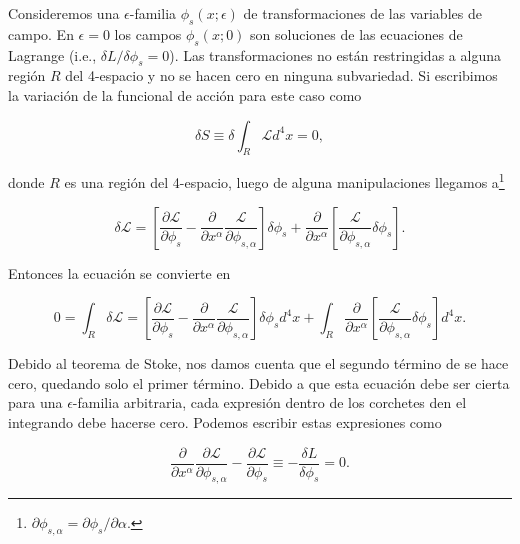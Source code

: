 \documentclass[a4paper,10pt]{article}
\numberwithin{equation}{section}
\begin{document}
\vspace{.3cm}

Consideremos una $\epsilon$-familia $\phi_s(x;\epsilon)$ de transformaciones de las 
variables de campo. En $\epsilon = 0$ los campos $\phi_s(x;0)$ son soluciones de 
las ecuaciones de Lagrange (i.e., $\delta L / \delta \phi_s = 0$). Las transformaciones 
no están restringidas a alguna región $R$ del 4-espacio y no se hacen cero en 
ninguna subvariedad. Si escribimos la variación de la funcional de acción para este 
caso como

\begin{equation}
 \delta S \equiv \delta \int_R \mathcal{L} d^4 x = 0,
 \label{eq:noet1}
\end{equation}

donde $R$ es una región del 4-espacio, luego de alguna manipulaciones llegamos a\footnote{ 
$\partial \phi_{s,\alpha} = \partial \phi_s / \partial \alpha$.} 

\begin{equation}
 \delta \mathcal{L} = \left[ \frac{\partial \mathcal{L}}{\partial \phi_s} 
 - \frac{\partial}{\partial x^\alpha}\frac{\mathcal{L}}{\partial \phi_{s,\alpha}} \right] 
 \delta \phi_s + \frac{\partial}{\partial x^\alpha}\left[\frac{\mathcal{L}}{\partial \phi_{s,\alpha}} 
 \delta \phi_s \right].
 \label{eq:noet2}
\end{equation}

Entonces la ecuación  se convierte en 

\begin{equation}
 0 = \int_R \delta \mathcal{L} = \left[ \frac{\partial \mathcal{L}}{\partial \phi_s} 
 - \frac{\partial}{\partial x^\alpha}\frac{\mathcal{L}}{\partial \phi_{s,\alpha}} \right] 
 \delta \phi_s d^4 x + \int_R \frac{\partial}{\partial x^\alpha}\left[\frac{\mathcal{L}}{\partial \phi_{s,\alpha}} 
 \delta \phi_s \right]d^4 x.
 \label{eq:noet3}
\end{equation}

Debido al teorema de Stoke, nos damos cuenta que el segundo término de  
se hace cero, quedando solo el primer término. Debido a que esta ecuación debe 
ser cierta para una $\epsilon$-familia arbitraria, cada expresión dentro de los corchetes 
den el integrando debe hacerse cero. Podemos escribir estas expresiones como 

\begin{equation}
 \frac{\partial}{\partial x^\alpha}\frac{\partial \mathcal{L}}{\partial \phi_{s,\alpha}} 
 - \frac{\partial \mathcal{L}}{\partial \phi_s} \equiv - \frac{\delta L}{\delta \phi_s} = 0.
\label{eq:noet4}
\end{equation}
\end{document}
